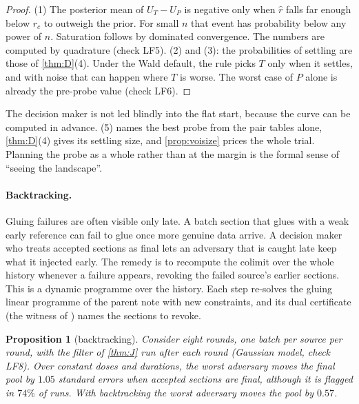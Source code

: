 \documentclass[11pt]{article}
\newtheorem{proposition}{Proposition}\newtheorem{corollary}{Corollary}\newtheorem{lemma}{Lemma}
\theoremstyle{definition}\newtheorem{definition}{Definition}\newtheorem{remark}{Remark}
\begin{document}
\begin{proof}
(1) The posterior mean of $U_T-U_P$ is negative only when $\hat r$ falls far enough below $r_c$ to outweigh the prior. For small $n$ that
event has probability below any power of $n$. Saturation follows by dominated convergence. The numbers are computed by quadrature
(check LF5). (2) and (3): the probabilities of settling are those of \cref{thm:D}(4). Under the Wald default, the rule picks $T$ only
when it settles, and with noise that can happen where $T$ is worse. The worst case of $P$ alone is already the pre-probe value (check LF6).
\end{proof}

The decision maker is not led blindly into the flat start, because the curve can be computed in advance. (5) names the best
probe from the pair tables alone, \cref{thm:D}(4) gives its settling size, and \cref{prop:voisize} prices the whole trial. Planning
the probe as a whole rather than at the margin is the formal sense of ``seeing the landscape''.

\paragraph{Backtracking.} Gluing failures are often visible only late. A batch section that glues with a weak early reference can fail
to glue once more genuine data arrive. A decision maker who treats accepted sections as final lets an adversary that is caught late keep
what it injected early. The remedy is to recompute the colimit over the whole history whenever a failure appears, revoking the failed
source's earlier sections. This is a dynamic programme over the history. Each step re-solves the gluing linear programme of the parent
note with new constraints, and its dual certificate (the witness of \cite{PG}) names the sections to revoke.

\begin{proposition}[backtracking]\label{prop:backtrack}
Consider eight rounds, one batch per source per round, with the filter of \cref{thm:J} run after each round (Gaussian model, check LF8).
Over constant doses and durations, the worst adversary moves the final pool by $1.05$ standard errors when accepted sections are final,
although it is flagged in $74\%$ of runs. With backtracking the worst adversary moves the pool by $0.57$.
\end{proposition}
\end{document}
